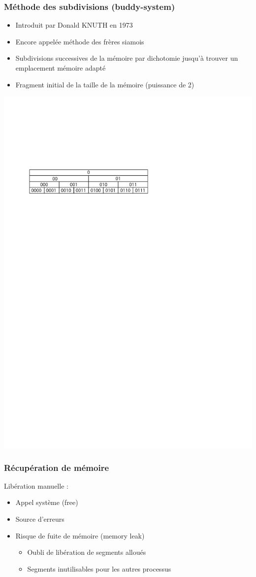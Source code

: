 \begin{frame}
\frametitle{Méthode des subdivisions (buddy-system)}
\begin{itemize}
\item Introduit par Donald KNUTH en 1973
\item Encore appelée méthode des frères siamois
\item Subdivisions successives de la mémoire par dichotomie jusqu'à trouver un emplacement mémoire adapté
\item Fragment initial de la taille de la mémoire (puissance de 2)
\end{itemize}
\includegraphics[width=\textwidth]{../illustration/buddy.pdf}
\end{frame}


\begin{frame}
\frametitle{Récupération de mémoire}
Libération manuelle :
\begin{itemize}
\item Appel système (free)
\item Source d’erreurs
\item Risque de fuite de mémoire (memory leak)
\begin{itemize}
\item Oubli de libération de segments alloués
\item Segments inutilisables pour les autres processus
\end{itemize}
\end{itemize}
\end{frame}


